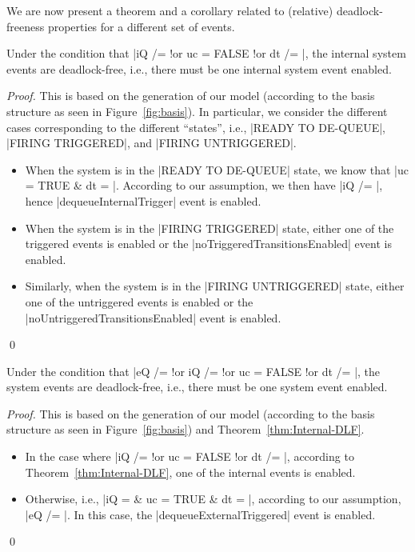 We are now present a theorem and a corollary related to (relative)
deadlock-freeness properties for a different set of events.
\begin{theorem}
  \label{thm:Internal-DLF}
  Under the condition that %
  |iQ /= {} !or uc = FALSE !or dt /= {}|, %
  the internal system events are deadlock-free, i.e., there must be
  one internal system event enabled.
\end{theorem}
\begin{proof}
  This is based on the generation of our \EventB model (according to
  the basis structure as seen in Figure~\ref{fig:basis}).  In
  particular, we consider the different cases corresponding to the
  different ``states'', i.e., |READY TO DE-QUEUE|, |FIRING TRIGGERED|,
  and |FIRING UNTRIGGERED|.
  \begin{itemize}
  \item When the system is in the |READY TO DE-QUEUE| state, we know
    that %
    |uc = TRUE & dt = {}|.  %
    According to our assumption, we then have |iQ /= {}|, hence
    |dequeueInternalTrigger| event is enabled.
    
  \item When the system is in the |FIRING TRIGGERED| state,
    either one of the triggered events is enabled or the
    |noTriggeredTransitionsEnabled| event is enabled.
    
  \item Similarly, when the system is in the |FIRING UNTRIGGERED|
    state, either one of the untriggered events is enabled or the
    |noUntriggeredTransitionsEnabled| event is enabled.  
  \end{itemize}
  \qed
\end{proof}
    
\begin{corollary}
  Under the condition that %
  |eQ /= {} !or iQ /= {} !or uc = FALSE !or dt /= {}|, %
  the system events are deadlock-free, i.e., there must be
  one system event enabled.
\end{corollary}
\begin{proof}
  This is based on the generation of our \EventB model (according to
  the basis structure as seen in Figure~\ref{fig:basis}) and
  Theorem~\ref{thm:Internal-DLF}.
  \begin{itemize}
  \item In the case where |iQ /= {} !or uc = FALSE !or dt /= {}|,
    according to Theorem~\ref{thm:Internal-DLF}, one of the internal
    events is enabled.
    
  \item Otherwise, i.e., |iQ = {} & uc = TRUE & dt = {}|, according to
    our assumption, |eQ /= {}|. In this case, the
    |dequeueExternalTriggered| event is enabled.
  \end{itemize}
  \qed
\end{proof}

